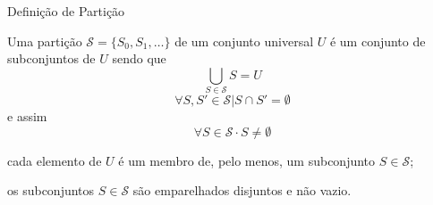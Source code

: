    
   \begin{frame}{Definição de Partição}
   
      Uma partição $ \mathcal{S} = \{S_0, S_1, \dots\} $ de um conjunto universal $ U $ é um conjunto de subconjuntos de $ U $ sendo que
         \begin{equation}
            \bigcup_{S \in \mathcal{S}} S = U \label{eq:part_form_1}
         \end{equation}
         \begin{equation}
            \forall S, S' \in \mathcal{S} | S \cap S' = \emptyset \label{eq:part_form_2}
         \end{equation}
         e assim
         \begin{equation}
            \forall S \in \mathcal{S} \cdot S \neq \emptyset \label{eq:part_form_3}
         \end{equation}

            \bigskip         
         
         \begin{description}
         \setlength{\itemsep}{0.6em}
            \item [Equ. \ref{eq:part_form_1}:] cada elemento de $ U $ é um membro de, pelo menos, um subconjunto $ S \in \mathcal{S} $;
            
            \item [Equ. \ref{eq:part_form_2} e \ref{eq:part_form_3}:] os subconjuntos $ S \in \mathcal{S} $ são emparelhados disjuntos e não vazio.
            
         \end{description}
      
   \end{frame}
   

